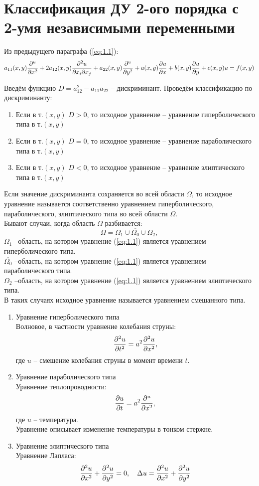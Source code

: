 \documentclass[../main.tex]{subfiles}
\begin{document}
\section{Классификация ДУ 2-ого порядка с 2-умя независимыми переменными}
Из предыдущего параграфа (\ref{eq:1.1}):
\[
    a_{11}(x,y)\frac{\partial ^u}{\partial x^2} + 2a_{12}(x,y)\frac{\partial ^2u}{\partial x_i \partial{x_j}} +
    a_{22}(x,y)\frac{\partial ^u}{\partial y^2} + a(x,y)\frac{\partial u}{\partial x} + b(x,y)\frac{\partial u}{\partial y} + c(x,y)u = f(x,y)
\]

Введём функцию $D = a_{12}^2-a_{11}a_{22}$ -- дискриминант.
Проведём классификацию по дискриминанту:
\begin{enumerate}
    \item 
    Если в т.$(x,y)$ $D>0$, то исходное уравнение -- 
    уравнение гиперболического типа в т.$(x,y)$
    \item
    Если в т.$(x,y)$ $D=0$, то исходное уравнение -- 
    уравнение параболического типа в т.$(x,y)$
    \item
    Если в т.$(x,y)$ $D<0$, то исходное уравнение -- 
    уравнение элиптического типа в т.$(x,y)$
\end{enumerate}

Если значение дискриминанта сохраняется во всей области $\Omega$, 
то исходное уравнение называется соответственно уравнением гиперболического,
параболического, элиптического типа во всей области $\Omega$.\\

Бывают случаи, когда область $\Omega$ разбивается:
\[\Omega = \Omega_1 \cup \overline{\Omega_0} \cup \Omega_2, \]
$\Omega_1$ --область, на котором уравнение (\ref{eq:1.1}) является уравнением гиперболического типа.\\
$\overline{\Omega_0}$ --область, на котором уравнение (\ref{eq:1.1}) является уравнением параболического типа.\\
$\Omega_2$ --область, на котором уравнение (\ref{eq:1.1}) является уравнением элиптического типа.\\
В таких случаях исходное уравнение называется уравнением смешанного типа.

\begin{enumerate}
    \item Уравнение гиперболического типа\\
    Волновое, в частности уравнение колебания струны:
    \[\frac{\partial ^2u}{\partial t^2}=a^2\frac{\partial ^2u}{\partial x^2},\]
    где $u$ -- смещение колебания струны в момент времени $t$.
    \item Уравнение параболического типа\\
    Уравнение теплопроводности:
    \[\frac{\partial u}{\partial t}=a^2\frac{\partial ^u}{\partial x^2},\]
    где $u$ -- температура.\\
    Уравнение описывает изменение температуры в тонком стержне.
    \item Уравнение элиптического типа\\
    Уравнение Лапласа:
    \[
        \frac{\partial ^2u}{\partial x^2}+\frac{\partial ^2u}{\partial y^2} = 0,\quad
        \Delta u=\frac{\partial ^2u}{\partial x^2}+\frac{\partial ^2u}{\partial y^2}
    \]
\end{enumerate}
\end{document}
